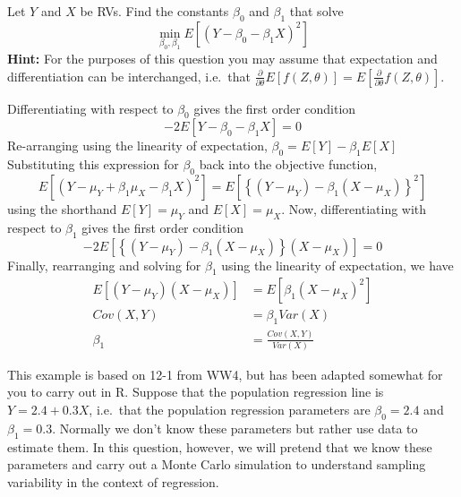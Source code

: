 \documentclass[addpoints,12pt]{exam}\usepackage[]{graphicx}\usepackage[]{xcolor}
\begin{document}
\begin{questions}

\question Let $Y$ and $X$ be RVs. Find the constants $\beta_0$ and $\beta_1$ that solve  
\[
  \min_{\beta_0, \beta_1} E[(Y - \beta_0 - \beta_1 X)^2]
\]
\textbf{Hint:} For the purposes of this question you may assume that expectation and differentiation can be interchanged, i.e.\ that $\frac{\partial}{\partial \theta} E[f(Z,\theta)] = E[\frac{\partial}{\partial \theta} f(Z,\theta)]$.
\begin{solution}
  Differentiating with respect to $\beta_0$ gives the first order condition
  \[
    -2 E[Y - \beta_0 - \beta_1 X] = 0
    \]
  Re-arranging using the linearity of expectation, $\beta_0 = E[Y] - \beta_1 E[X]$
  Substituting this expression for $\beta_0$ back into the objective function, 
  \[
    E[(Y - \mu_Y + \beta_1 \mu_X - \beta_1 X)^2] = E\left[ \left\{ (Y-\mu_Y) - \beta_1 (X - \mu_X)\right\}^2\right]
  \]
  using the shorthand $E[Y] = \mu_Y$ and $E[X] = \mu_X$.
  Now, differentiating with respect to $\beta_1$ gives the first order condition
  \[
    -2 E\left[ \left\{(Y - \mu_Y) - \beta_1(X - \mu_X)\right\} (X - \mu_X)\right] = 0
    \]
 Finally, rearranging and solving for $\beta_1$ using the linearity of expectation, we have
 \begin{align*}
    E[(Y - \mu_Y)(X - \mu_X)] &=  E[\beta_1(X - \mu_X)^2]\\
    Cov(X,Y) &=  \beta_1 Var(X)\\
    \beta_1 &= \frac{Cov(X,Y)}{Var(X)}
 \end{align*}
\end{solution}

	\question This example is based on 12-1 from WW4, but has been adapted somewhat for you to carry out in R. Suppose that the population regression line is $Y = 2.4 + 0.3 X$, i.e.\ that the population regression parameters are $\beta_0 = 2.4$ and $\beta_1 = 0.3$. Normally we don't know these parameters but rather use data to estimate them. In this question, however, we will pretend that we know these parameters and carry out a Monte Carlo simulation to understand sampling variability in the context of regression.
	\begin{parts}

\end{parts}
\end{questions}
\end{document}
